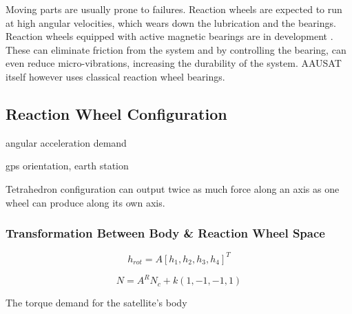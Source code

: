Moving parts are usually prone to failures. Reaction wheels are expected to run at high angular velocities, which wears down the lubrication and the bearings. Reaction wheels equipped with active magnetic bearings are in development \cite{GERLACH2006572}. These can eliminate friction from the system and by controlling the bearing, can even reduce micro-vibrations, increasing the durability of the system. AAUSAT  itself however uses classical reaction wheel bearings.

\subsection{Reaction Wheel Configuration}

angular acceleration demand \cite{ReactionWheelConfigSim} \cite{ReactConfigThesis}

gps orientation, earth station

Tetrahedron configuration can output twice as much force along an axis as one wheel can produce along its own axis.

\subsubsection{Transformation Between Body \& Reaction Wheel Space}

\cite[equation 18.41-42]{SADC}

\begin{equation}
h_{rot} = A\left[ h_1, h_2, h_3, h_4 \right]^T
\end{equation}

\begin{equation}
N = A^R \textbf{$N_c$} + k\left(1,-1,-1,1\right)
\end{equation}


The torque demand for the satellite's body

